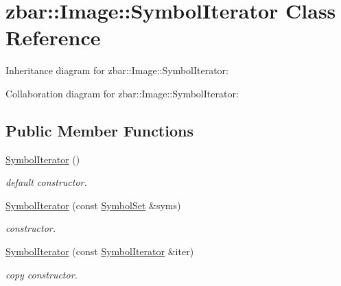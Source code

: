 \hypertarget{classzbar_1_1_image_1_1_symbol_iterator}{
\section{zbar::Image::SymbolIterator Class Reference}
\label{classzbar_1_1_image_1_1_symbol_iterator}
}


Inheritance diagram for zbar::Image::SymbolIterator:


Collaboration diagram for zbar::Image::SymbolIterator:
\subsection*{Public Member Functions}
\begin{DoxyCompactItemize}
\item 
\hypertarget{classzbar_1_1_image_1_1_symbol_iterator_a47bc5cea07fbde6417cb1015cd4a7aa1}{
\hyperlink{classzbar_1_1_image_1_1_symbol_iterator_a47bc5cea07fbde6417cb1015cd4a7aa1}{SymbolIterator} ()}
\label{classzbar_1_1_image_1_1_symbol_iterator_a47bc5cea07fbde6417cb1015cd4a7aa1}

\begin{DoxyCompactList}\small\item\em default constructor. \end{DoxyCompactList}\item 
\hypertarget{classzbar_1_1_image_1_1_symbol_iterator_a3f331f344eacf43b7c2cb328c88fae69}{
\hyperlink{classzbar_1_1_image_1_1_symbol_iterator_a3f331f344eacf43b7c2cb328c88fae69}{SymbolIterator} (const \hyperlink{classzbar_1_1_symbol_set}{SymbolSet} \&syms)}
\label{classzbar_1_1_image_1_1_symbol_iterator_a3f331f344eacf43b7c2cb328c88fae69}

\begin{DoxyCompactList}\small\item\em constructor. \end{DoxyCompactList}\item 
\hypertarget{classzbar_1_1_image_1_1_symbol_iterator_ae31e5cced841d831d3c1129b18c57387}{
\hyperlink{classzbar_1_1_image_1_1_symbol_iterator_ae31e5cced841d831d3c1129b18c57387}{SymbolIterator} (const \hyperlink{classzbar_1_1_image_1_1_symbol_iterator}{SymbolIterator} \&iter)}
\label{classzbar_1_1_image_1_1_symbol_iterator_ae31e5cced841d831d3c1129b18c57387}

\begin{DoxyCompactList}\small\item\em copy constructor. \end{DoxyCompactList}\end{DoxyCompactItemize}


